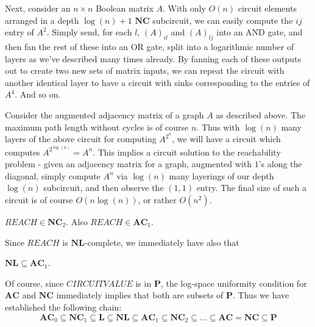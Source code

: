 Next, consider an $n \times n$ Boolean matrix $A$. With only $O(n)$ circuit elements arranged in a depth $\log(n)+1$ $\bm{NC}$ subcircuit, we can easily compute the $ij$ entry of $A^2$. Simply send, for each $l$, $(A)_{il}$ and $(A)_{lj}$ into an AND gate, and then fan the rest of these into an OR gate, split into a logarithmic number of layers as we've described many times already. By fanning each of these outputs out to create two new sets of matrix inputs, we can repeat the circuit with another identical layer to have a circuit with sinks corresponding to the entries of $A^4$. And so on. \par 
Consider the augmented adjacency matrix of a graph $A$ as described above. The maximum path length without cycles is of course $n$. Thus with $\log(n)$ many layers of the above circuit for computing $A^{2^n}$, we will have a circuit which computes $A^{2^{\log(n)}} = A^n$. This implies a circuit solution to the reachability problem - given an adjacency matrix for a graph, augmented with $1$'s along the diagonal, simply compute $A^n$ via $\log(n)$ many layerings of our depth $\log(n)$ subcircuit, and then observe the $(1,1)$ entry. The final size of such a circuit is of course $O(n\log(n))$, or rather $O(n^2)$.  
\begin{corollary}
	$REACH \in \bm{NC}_2$. Also $REACH \in \bm{AC}_1$. 
\end{corollary} 
Since $REACH$ is $\bm{NL}$-complete, we immediately have also that
\begin{corollary}
	$\bm{NL} \subseteq \bm{AC}_1$.
\end{corollary}
Of course, since $CIRCUITVALUE$ is in $\bm{P}$, the log-space uniformity condition for $\bm{AC}$ and $\bm{NC}$ immediately implies that both are subsets of $\bm{P}$. Thus we have established the following chain:
\[ \bm{AC}_0 \subseteq \bm{NC}_1 \subseteq \bm{L} \subseteq \bm{NL} \subseteq \bm{AC}_1 \subseteq \bm{NC}_2 \subseteq \ldots \subseteq \bm{AC} = \bm{NC} \subseteq \bm{P} \]
